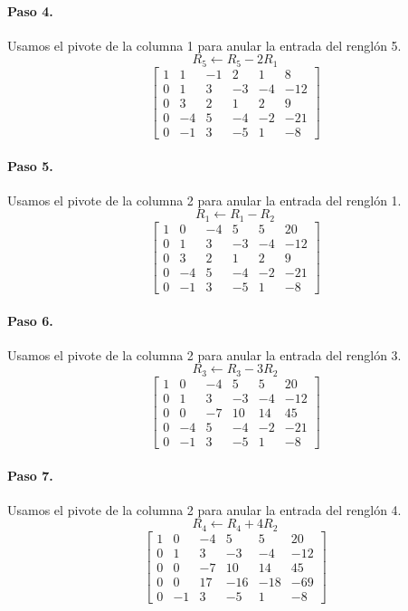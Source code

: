 \documentclass[12pt]{article}
\theoremstyle{remark}
\begin{document}
\paragraph{Paso 4.} Usamos el pivote de la columna 1 para anular la entrada del renglón 5.
\[
R_{5}\leftarrow R_{5}-2R_{1}
\]
\[
\left[\begin{array}{ccccc|c}
1 & 1 & -1 & 2 & 1 & 8\\
0 & 1 & 3 & -3 & -4 & -12\\
0 & 3 & 2 & 1 & 2 & 9\\
0 & -4 & 5 & -4 & -2 & -21\\
0 & -1 & 3 & -5 & 1 & -8
\end{array}\right]
\]
\paragraph{Paso 5.} Usamos el pivote de la columna 2 para anular la entrada del renglón 1.
\[
R_{1}\leftarrow R_{1}-R_{2}
\]
\[
\left[\begin{array}{ccccc|c}
1 & 0 & -4 & 5 & 5 & 20\\
0 & 1 & 3 & -3 & -4 & -12\\
0 & 3 & 2 & 1 & 2 & 9\\
0 & -4 & 5 & -4 & -2 & -21\\
0 & -1 & 3 & -5 & 1 & -8
\end{array}\right]
\]
\paragraph{Paso 6.} Usamos el pivote de la columna 2 para anular la entrada del renglón 3.
\[
R_{3}\leftarrow R_{3}-3R_{2}
\]
\[
\left[\begin{array}{ccccc|c}
1 & 0 & -4 & 5 & 5 & 20\\
0 & 1 & 3 & -3 & -4 & -12\\
0 & 0 & -7 & 10 & 14 & 45\\
0 & -4 & 5 & -4 & -2 & -21\\
0 & -1 & 3 & -5 & 1 & -8
\end{array}\right]
\]
\paragraph{Paso 7.} Usamos el pivote de la columna 2 para anular la entrada del renglón 4.
\[
R_{4}\leftarrow R_{4}+4R_{2}
\]
\[
\left[\begin{array}{ccccc|c}
1 & 0 & -4 & 5 & 5 & 20\\
0 & 1 & 3 & -3 & -4 & -12\\
0 & 0 & -7 & 10 & 14 & 45\\
0 & 0 & 17 & -16 & -18 & -69\\
0 & -1 & 3 & -5 & 1 & -8
\end{array}\right]
\]
\end{document}
